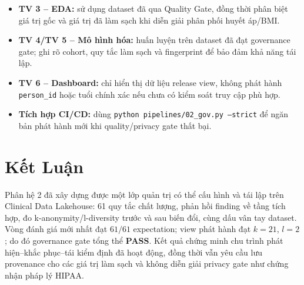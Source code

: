 \documentclass[11pt,a4paper]{article}
\begin{document}
\begin{itemize}
    \item \textbf{TV 3 -- EDA:} sử dụng dataset đã qua Quality Gate, đồng thời phân biệt giá trị gốc và giá trị đã làm sạch khi diễn giải phân phối huyết áp/BMI.
    \item \textbf{TV 4/TV 5 -- Mô hình hóa:} huấn luyện trên dataset đã đạt governance gate; ghi rõ cohort, quy tắc làm sạch và fingerprint để bảo đảm khả năng tái lập.
    \item \textbf{TV 6 -- Dashboard:} chỉ hiển thị dữ liệu release view, không phát hành \texttt{person\_id} hoặc tuổi chính xác nếu chưa có kiểm soát truy cập phù hợp.
    \item \textbf{Tích hợp CI/CD:} dùng \texttt{python pipelines/02\_gov.py --strict} để ngăn bản phát hành mới khi quality/privacy gate thất bại.
\end{itemize}

\section{Kết Luận}

Phân hệ 2 đã xây dựng được một lớp quản trị có thể cấu hình và tái lập trên Clinical Data Lakehouse: 61 quy tắc chất lượng, phản hồi finding về tầng tích hợp, đo k-anonymity/l-diversity trước và sau biến đổi, cùng dấu vân tay dataset. Vòng đánh giá mới nhất đạt $61/61$ expectation; view phát hành đạt $k=21$, $l=2$; do đó governance gate tổng thể \textbf{PASS}. Kết quả chứng minh chu trình phát hiện--khắc phục--tái kiểm định đã hoạt động, đồng thời vẫn yêu cầu lưu provenance cho các giá trị làm sạch và không diễn giải privacy gate như chứng nhận pháp lý HIPAA.
\end{document}
